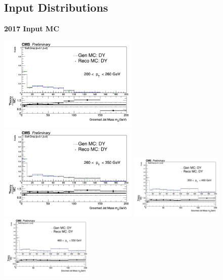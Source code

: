 \documentclass{beamer}
\begin{document}
\subsection{Input Distributions}

\begin{frame}{\textbf{2017 Input MC}}



\includegraphics[width=0.5\textwidth]{Oct31_unfoldPlots_sdB0/InputlocalrecobinnedMC_mass_Ptbin200to260_Detbinning_Groomingis_sdB0.png}%
\includegraphics[width=0.5\textwidth]{Oct31_unfoldPlots_sdB0/InputlocalrecobinnedMC_mass_Ptbin260to350_Detbinning_Groomingis_sdB0.png}
\newline
\includegraphics[width=0.3333\textwidth]{Oct31_unfoldPlots_sdB0/InputlocalrecobinnedMC_mass_Ptbin350to460_Detbinning_Groomingis_sdB0.png}%
\includegraphics[width=0.3333\textwidth]{Oct31_unfoldPlots_sdB0/InputlocalrecobinnedMC_mass_Ptbin460to550_Detbinning_Groomingis_sdB0.png}

\end{frame}
\end{document}
